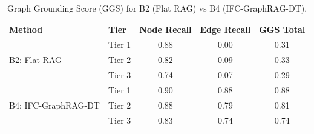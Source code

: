 \begin{table}[t]
\centering
\caption{Graph Grounding Score (GGS) for B2 (Flat RAG) vs B4 (IFC-GraphRAG-DT).}
\label{tab:ggs_results}
\begin{tabular}{llccc}
\toprule
Method & Tier & Node Recall & Edge Recall & GGS Total \\
\midrule
\multirow{3}{*}{B2: Flat RAG} & Tier 1 & 0.88 & 0.00 & 0.31 \\
 & Tier 2 & 0.82 & 0.09 & 0.33 \\
 & Tier 3 & 0.74 & 0.07 & 0.29 \\
\midrule
\multirow{3}{*}{B4: IFC-GraphRAG-DT} & Tier 1 & 0.90 & 0.88 & 0.88 \\
 & Tier 2 & 0.88 & 0.79 & 0.81 \\
 & Tier 3 & 0.83 & 0.74 & 0.74 \\
\midrule
\bottomrule
\end{tabular}
\end{table}